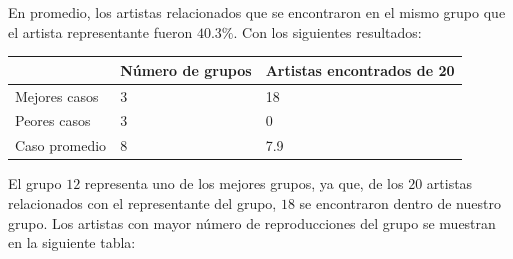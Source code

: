 \documentclass[conference]{IEEEtran}
\begin{document}
En promedio, los artistas relacionados que se encontraron en el mismo grupo que el artista representante fueron $40.3 \%$. Con los siguientes resultados: 


\begin{tabular}{|L{2.5cm}|C{2.5cm} |C{2.5cm} |}
\label{tab:artistas_encontrados_count}
 \hline
& Número de grupos & Artistas encontrados de 20\\ \hline
Mejores casos & 3 & 18 \\ \hline
Peores casos & 3 & 0 \\ \hline
Caso promedio & 8 & 7.9 \\ \hline
\end{tabular}


El grupo $12$ representa uno de los  mejores grupos, ya que, de los $20$ artistas relacionados con el representante del grupo, $18$ se encontraron dentro de nuestro grupo. 
Los artistas con mayor número de reproducciones del grupo se muestran
en la siguiente tabla: 
\end{document}
